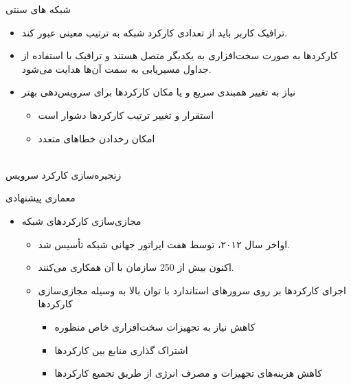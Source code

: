 \documentclass{beamer}
\makeatletter
\newcommand{\RTList}{\raggedleft\rightskip\@totalleftmargin}
\makeatother
\begin{document}
\begin{persian}
	\begin{frame}{شبکه های سنتی}
		\begin{itemize}\RTList{}
			\justifying
			\item ترافیک کاربر باید از تعدادی کارکرد شبکه به ترتیب معینی عبور کند.
			\item کارکردها به صورت سخت‌افزاری به یکدیگر متصل هستند و ترافیک با استفاده از جداول مسیریابی به سمت آن‌ها هدایت می‌شود.
			\item نیاز به تغییر همبندی سریع و یا مکان کارکردها برای سرویس‌دهی بهتر
			      \begin{itemize}\RTList{}
				      \item استقرار و تغییر ترتیب کارکردها دشوار است
				      \item امکان رخدادن خطاهای متعدد
			      \end{itemize}
		\end{itemize}
		\begin{block}{}
			\centering
			\\
			زنجیره‌سازی کارکرد سرویس
		\end{block}
	\end{frame}

	\begin{frame}{معماری پیشنهادی}
		\begin{itemize}\RTList{}
			\justifying
			\item مجازی‌سازی کارکردهای شبکه
			      \begin{itemize}\RTList{}
				      \item اواخر سال ۲۰۱۲،  توسط هفت اپراتور جهانی شبکه تأسیس شد.
				      \item اکنون بیش از 250 سازمان با آن همکاری می‌کنند.
				      \item اجرای کارکردها بر روی سرورهای استاندارد با توان بالا به وسیله مجازی‌سازی کارکردها
				            \begin{itemize}\RTList{}
					            \item کاهش نیاز به تجهیزات سخت‌افزاری خاص منظوره
					            \item اشتراک گذاری منابع بین کارکرد‌ها
					            \item کاهش هزینه‌های تجهیزات و مصرف انرژی از طریق تجمیع کارکردها
				            \end{itemize}
			      \end{itemize}
		\end{itemize}
	\end{frame}


\end{persian}
\end{document}
